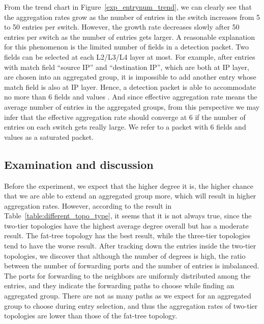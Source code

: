 From the trend chart in Figure~\ref{exp_entrynum_trend}, we can clearly see that the aggregation rates grow as the number of entries in the switch increases from 5 to 50 entries per switch. However, the growth rate decreases slowly after 50 entries per switch as the number of entries gets larger. A reasonable explanation for this phenomenon is the limited number of fields in a detection packet. Two fields can be selected at each L2/L3/L4 layer at most. For example, after entries with match field ``source IP'' and ``destination IP'', which are both at IP layer, are chosen into an aggregated group, it is impossible to add another entry whose match field is also at IP layer. Hence, a detection packet is able to accommodate no more than 6 fields and values \sout{}. \sout{} And since effective aggregation rate means the average number of entries in the aggregated groups, from this perspective we may infer that the effective aggregation rate should converge at 6 if the number of entries on each switch gets really large. We refer to a packet with 6 fields and values as a saturated packet.


\subsection{Examination and discussion}
\label{examination_and_discussion}

Before the experiment, we expect that the higher degree it is, the higher chance that we are able to extend an aggregated group more, which will result in higher aggregation rates. However, according to the result in Table~\ref{table:different_topo_type}, it seems that it is not always true, since the two-tier topologies have the highest average degree overall but has a moderate result. The fat-tree topology has the best result, while the three-tier topologies tend to have the worse result. After tracking down the entries inside the two-tier topologies, we discover that although the number of degrees is high, the ratio between the number of forwarding ports and the number of entries is imbalanced. The ports for forwarding to the neighbors are uniformly distributed among the entries, and they indicate the forwarding paths to choose while finding an aggregated group. There are not as many paths as we expect for an aggregated group to choose during entry selection, and thus the aggregation rates of two-tier topologies are lower than those of the fat-tree topology. 

